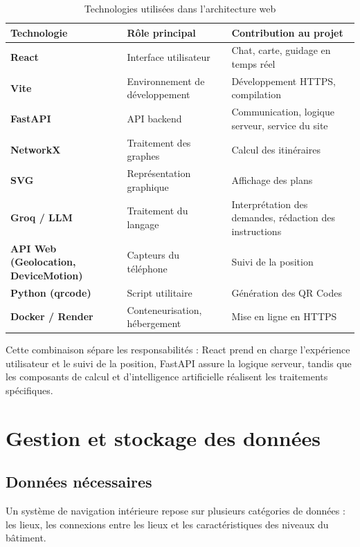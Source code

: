 \documentclass[12pt,a4paper]{report}
\begin{document}
\begin{table}[h]
\centering
\caption{Technologies utilisées dans l'architecture web}
\label{tab:web}
\small
\begin{tabularx}{\linewidth}{@{}lXX@{}}
\toprule
\textbf{Technologie} & \textbf{Rôle principal} & \textbf{Contribution au projet}\\
\midrule
\textbf{React} & Interface utilisateur & Chat, carte, guidage en temps réel\\
\textbf{Vite} & Environnement de développement & Développement HTTPS, compilation\\
\textbf{FastAPI} & API backend & Communication, logique serveur, service du site\\
\textbf{NetworkX} & Traitement des graphes & Calcul des itinéraires\\
\textbf{SVG} & Représentation graphique & Affichage des plans\\
\textbf{Groq / LLM} & Traitement du langage & Interprétation des demandes, rédaction des instructions\\
\textbf{API Web (Geolocation, DeviceMotion)} & Capteurs du téléphone & Suivi de la position\\
\textbf{Python (qrcode)} & Script utilitaire & Génération des QR Codes\\
\textbf{Docker / Render} & Conteneurisation, hébergement & Mise en ligne en HTTPS\\
\bottomrule
\end{tabularx}
\end{table}

Cette combinaison sépare les responsabilités : React prend en charge l'expérience utilisateur et
le suivi de la position, FastAPI assure la logique serveur, tandis que les composants de calcul et
d'intelligence artificielle réalisent les traitements spécifiques.

\section{Gestion et stockage des données}

\subsection{Données nécessaires}

Un système de navigation intérieure repose sur plusieurs catégories de données : les lieux, les
connexions entre les lieux et les caractéristiques des niveaux du bâtiment.
\end{document}
